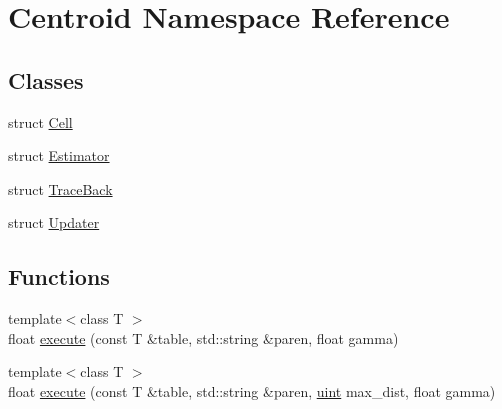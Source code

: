 \hypertarget{namespace_centroid}{\section{Centroid Namespace Reference}
\label{namespace_centroid}
}
\subsection*{Classes}
\begin{DoxyCompactItemize}
\item 
struct \hyperlink{struct_centroid_1_1_cell}{Cell}
\item 
struct \hyperlink{struct_centroid_1_1_estimator}{Estimator}
\item 
struct \hyperlink{struct_centroid_1_1_trace_back}{Trace\+Back}
\item 
struct \hyperlink{struct_centroid_1_1_updater}{Updater}
\end{DoxyCompactItemize}
\subsection*{Functions}
\begin{DoxyCompactItemize}
\item 
{\footnotesize template$<$class T $>$ }\\float \hyperlink{namespace_centroid_aae279838f4de04965b126f2760d1c2cb}{execute} (const T \&table, std\+::string \&paren, float gamma)
\item 
{\footnotesize template$<$class T $>$ }\\float \hyperlink{namespace_centroid_a065a8778b18ed5997785ee42f45c4b9f}{execute} (const T \&table, std\+::string \&paren, \hyperlink{cyktable_8h_a91ad9478d81a7aaf2593e8d9c3d06a14}{uint} max\+\_\+dist, float gamma)
\end{DoxyCompactItemize}



